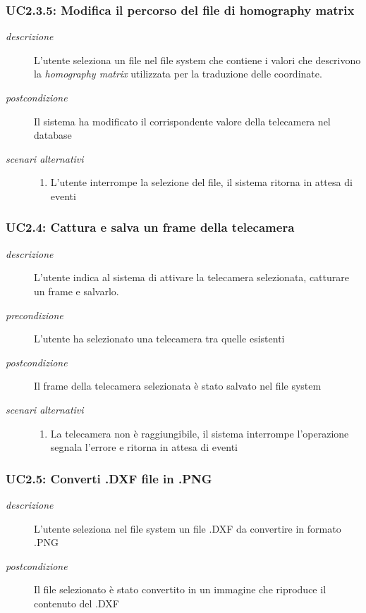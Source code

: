 \subsubsection{UC2.3.5: Modifica il percorso del file di homography matrix} \label{sec:UC2.3.5}
\begin{description}
\item[\em{descrizione }]L'utente seleziona un file nel file system che contiene i valori che descrivono la  \textit{homography matrix} utilizzata per la traduzione delle coordinate.
\item[\em{postcondizione }] Il sistema ha modificato il corrispondente valore della telecamera nel database
\item[\em{scenari alternativi }] \mbox{}

  \begin{enumerate}
\item L'utente interrompe la selezione del file, il sistema ritorna in attesa di eventi
\end{enumerate}
\end{description}

\subsubsection{UC2.4: Cattura e salva un frame della telecamera} \label{sec:UC2.4}
\begin{description}
\item[\em{descrizione }]L'utente indica al sistema di attivare la telecamera selezionata, catturare un frame e salvarlo.
\item[\em{precondizione }] L'utente ha selezionato una telecamera tra quelle esistenti
\item[\em{postcondizione }] Il frame della telecamera selezionata è stato salvato nel file system
\item[\em{scenari alternativi }] \mbox{}

  \begin{enumerate}
\item La telecamera non è raggiungibile, il sistema interrompe l'operazione segnala l'errore e ritorna in attesa di eventi
\end{enumerate}
\end{description}

\subsubsection{UC2.5: Converti .DXF file in .PNG} \label{sec:UC2.5}
\begin{description}
\item[\em{descrizione }]L'utente seleziona nel file system un file .DXF da convertire in formato .PNG 
    
\item[\em{postcondizione }] Il file selezionato è stato convertito in un immagine che riproduce il contenuto del .DXF
\end{description}

